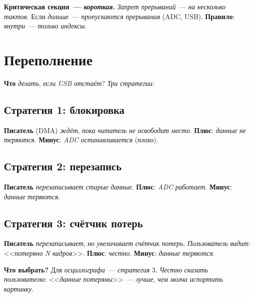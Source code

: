 \begin{keybox}
\textbf{Критическая секция~--- \emph{короткая}.}
\emph{Запрет} \emph{прерываний}~--- \emph{на} \emph{несколько}
\emph{тактов}. Если \emph{дольше}~--- \emph{пропускаются}
\emph{прерывания} (ADC, USB). \textbf{Правило}:
\emph{внутри}~--- \emph{только} \emph{индексы}.
\end{keybox}

\section{Переполнение}
\label{sec:ring-overflow}

\textbf{Что} \emph{делать}, \emph{если} \emph{USB}
\emph{отстаёт}? \emph{Три} \emph{стратегии}:

\subsection{Стратегия 1: блокировка}

\textbf{Писатель} (DMA) \emph{ждёт}, \emph{пока}
\emph{читатель} \emph{не} \emph{освободит} \emph{место}.
\textbf{Плюс}: \emph{данные} \emph{не} \emph{теряются}.
\textbf{Минус}: \emph{ADC} \emph{останавливается} (\emph{плохо}).

\subsection{Стратегия 2: перезапись}

\textbf{Писатель} \emph{перезаписывает} \emph{старые}
\emph{данные}. \textbf{Плюс}: \emph{ADC} \emph{работает}.
\textbf{Минус}: \emph{данные} \emph{теряются}.

\subsection{Стратегия 3: счётчик потерь}

\textbf{Писатель} \emph{перезаписывает}, \emph{но}
\emph{увеличивает} \emph{счётчик} \emph{потерь}.
\emph{Пользователь} \emph{видит}: <<\emph{потеряно}
\emph{N} \emph{кадров}>>. \textbf{Плюс}: \emph{честно}.
\textbf{Минус}: \emph{данные} \emph{теряются}.

\begin{ideabox}
\textbf{Что выбрать?} Для \emph{осциллографа}~---
\emph{стратегия} 3. \emph{Честно} \emph{сказать}
\emph{пользователю}: <<\emph{данные} \emph{потеряны}>>~---
\emph{лучше}, \emph{чем} \emph{молча} \emph{испортить}
\emph{картинку}.
\end{ideabox}

